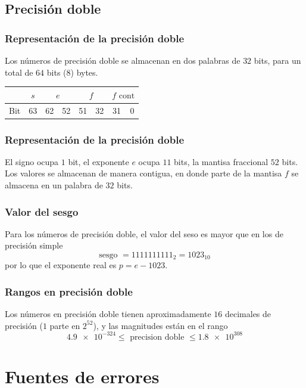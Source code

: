 \subsection{Precisión doble}
\begin{frame}
\frametitle{Representación de la precisión doble}
Los números de precisión doble se almacenan en dos palabras de $32$ bits, para un total de $64$ bits ($8$) bytes.
\pause
\begin{table}
\fontsize{12}{12}\selectfont
\begin{tabular}{ l | c | c | c | c | c | c | c |}
\cline{2-8}
 {} & $s$ & \multicolumn{2}{c|}{$e$} & \multicolumn{2}{c|}{$f$} & \multicolumn{2}{c|}{$f \text{ cont}$} \\ \hline
 Bit & 63 & 62 & 52 & 51 & 32 & 31 & 0 \\ \hline
\end{tabular}
\end{table}
\end{frame}
\begin{frame}
\frametitle{Representación de la precisión doble}
El signo ocupa $1$ bit, el exponente $e$ ocupa $11$ bits, la mantisa fraccional $52$ bits.
\\
\bigskip
Los valores se almacenan de manera contigua, en donde parte de la mantisa $f$ se almacena en un palabra de $32$ bits.
\end{frame}
\begin{frame}
\frametitle{Valor del sesgo}
Para los números de precisión doble, el valor del seso es mayor que en los de precisión simple
\[ \text{sesgo } = 1111111111_{2} = 1023_{10} \]
por lo que el exponente real es $p = e - 1023$.
\end{frame}
\begin{frame}
\frametitle{Rangos en precisión doble}
Los números en precisión doble tienen aproximadamente $16$ decimales de precisión ($1$ parte en $2^{52}$), y las magnitudes están en el rango
\[ \num{4.9e-324} \leq \text{ precision doble } \leq \num{1.8e308} \]
\end{frame}
\section{Fuentes de errores}
